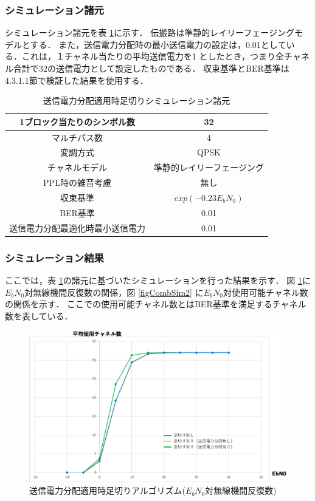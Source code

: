 \subsubsection{シミュレーション諸元}
シミュレーション諸元を表 \ref{tabComb1}に示す．
伝搬路は準静的レイリーフェージングモデルとする．
また，送信電力分配時の最小送信電力の設定は，0.01としている．これは，１チャネル当たりの平均送信電力を1
としたとき，つまり全チャネル合計で32の送信電力として設定したものである．
収束基準とBER基準は4.3.1.1節で検証した結果を使用する．

\begin{table}[h]
    \begin{tabular}{|c|c|} \hline
        1ブロック当たりのシンボル数 & 32 \\ \hline
        マルチパス数 & 4 \\ \hline
        変調方式 & QPSK \\ \hline
        チャネルモデル & 準静的レイリーフェージング \\ \hline
        PPL時の雑音考慮 & 無し \\ \hline
        収束基準 & $exp(-0.23E_bN_0)$ \\ \hline
        BER基準 & 0.01 \\ \hline
        送信電力分配最適化時最小送信電力 & 0.01 \\ \hline
    \end{tabular}
    \centering
    \caption{送信電力分配適用時足切りシミュレーション諸元}
    \label{tabComb1}
\end{table}

\subsubsection{シミュレーション結果}
ここでは，表 \ref{tabComb1}の諸元に基づいたシミュレーションを行った結果を示す．
図 \ref{figCombSim1}に$E_bN_0$対無線機間反復数の関係，図 \ref{figCombSim2}
に$E_bN_0$対使用可能チャネル数の関係を示す．
ここでの使用可能チャネル数とはBER基準を満足するチャネル数を表している．

\begin{figure}[h]
    \centering
    \includegraphics[width=0.95\linewidth]{chapter4/figure/CombSim1.eps}
    \caption{送信電力分配適用時足切りアルゴリズム($E_bN_0$対無線機間反復数)}
    \label{figCombSim1}
\end{figure}

